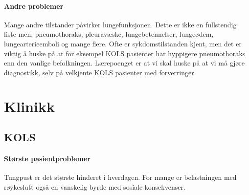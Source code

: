             \paragraph{Andre problemer\\}
            	Mange andre tilstander påvirker lungefunksjonen. Dette er ikke en fullstendig liste men: pneumothoraks, pleuravæske, lungebetennelser, lungeødem, lungearterieemboli og mange flere. Ofte er sykdomstilstanden kjent, men det er viktig å huske på at for eksempel KOLS pasienter har hyppigere pneumothoraks enn den vanlige befolkningen. Lærepoenget er at vi skal huske på at vi må gjøre diagnostikk, selv på velkjente KOLS pasienter med forverringer. 
		\section{Klinikk}
			\subsection{KOLS}
				\paragraph{Største pasientproblemer\\}
					Tungpust er det største hinderet i hverdagen. For mange er belastningen med røykeslutt også en vanskelig byrde med sosiale konsekvenser. 
